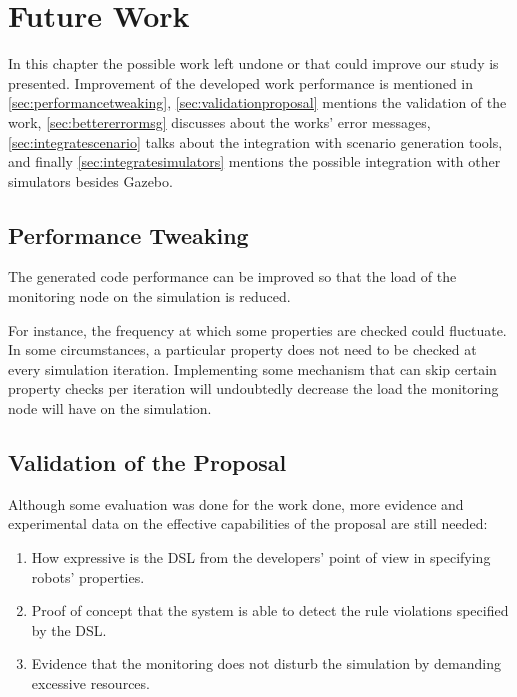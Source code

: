 \chapter{Future Work}
\label{chap:futurework}

In this chapter the possible work left undone or that could improve our study is presented.
Improvement of the developed work performance is mentioned in \autoref{sec:performancetweaking}, \autoref{sec:validationproposal} mentions the validation of the work, \autoref{sec:bettererrormsg} discusses about the works' error messages, \autoref{sec:integratescenario} talks about the integration with scenario generation tools, and finally \autoref{sec:integratesimulators} mentions the possible integration with other simulators besides Gazebo.


\section{Performance Tweaking}
\label{sec:performancetweaking}

The generated code performance can be improved so that the load of the monitoring node on the simulation is reduced.

For instance, the frequency at which some properties are checked could fluctuate. In some circumstances, a particular property does not need to be checked at every simulation iteration. Implementing some mechanism that can skip certain property checks per iteration will undoubtedly decrease the load the monitoring node will have on the simulation.


\section{Validation of the Proposal}
\label{sec:validationproposal}

Although some evaluation was done for the work done, more evidence and experimental data on the effective capabilities of the proposal are still needed:

\begin{enumerate}
    \item How expressive is the DSL from the developers' point of view in specifying robots' properties.
    \item Proof of concept that the system is able to detect the rule violations specified by the DSL.
    \item Evidence that the monitoring does not disturb the simulation by demanding excessive resources.
\end{enumerate}


